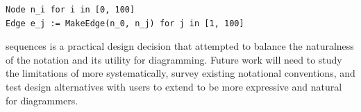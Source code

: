 \vspace{1em}
\begin{mdframed}[style=SUBCode]
\begin{lstlisting}[language=Sub-graph,escapechar=@]
Node n_i for i in [0, 100]
Edge e_j := MakeEdge(n_0, n_j) for j in [1, 100]
\end{lstlisting}
\end{mdframed}
\vspace{1em}

\Substance{} sequences is a practical design decision that attempted to balance the naturalness of the \Substance{} notation and its utility for diagramming. Future work will need to study the limitations of \Substance{} more systematically, survey existing notational conventions, and test design alternatives with users to extend \Substance{} to be more expressive and natural for diagrammers. 


